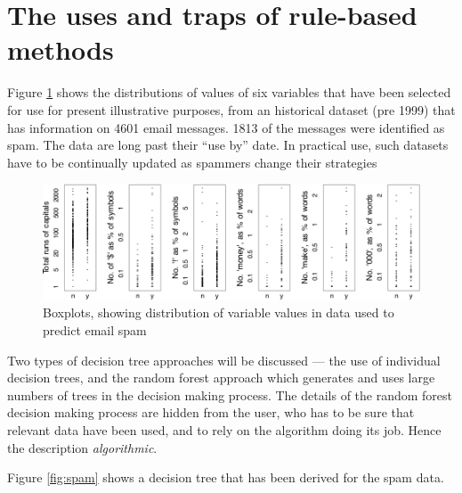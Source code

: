 \documentclass[
  10pt,
  b5paper]{book}
\begin{document}
\hypertarget{the-uses-and-traps-of-rule-based-methods}{%
\section{The uses and traps of rule-based methods}\label{the-uses-and-traps-of-rule-based-methods}}

Figure \ref{fig:seeSpam} shows the distributions of
values of six variables that have been selected for use
for present illustrative purposes, from an historical
dataset (pre 1999) that has information on 4601 email
messages. 1813 of the messages were identified as spam.
The data are long past their ``use by'' date. In practical
use, such datasets have to be continually updated as
spammers change their strategies

\begin{figure}[H]

{\centering \includegraphics{08-observational_files/figure-latex/seeSpam-1} 

}

\caption{Boxplots, showing distribution of variable values
               in data used to predict email spam}\label{fig:seeSpam}
\end{figure}

Two types of decision tree approaches will be discussed
--- the use of individual decision trees, and the
random forest approach which generates and uses large
numbers of trees in the decision making process. The
details of the random forest decision making process
are hidden from the user, who has to be sure that
relevant data have been used, and to rely on the
algorithm doing its job. Hence the description
\emph{algorithmic}.

Figure \ref{fig:spam} shows a decision tree that has been derived
for the spam data.
\end{document}
